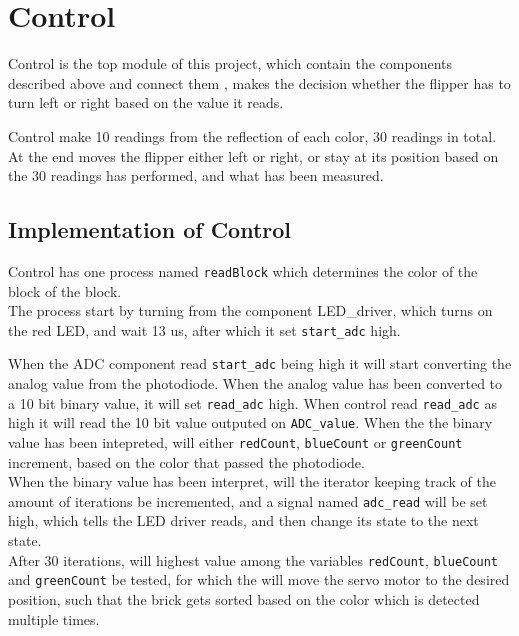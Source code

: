 \section{Control}
Control is the top module of this project, which contain the components described above and connect them , makes the decision whether the flipper has to turn left or right based on the value it reads.

Control make 10 readings from the reflection of each color,  30 readings in total. At the end moves the flipper either left or right, or stay at its position based on the 30 readings has performed, and what has been measured. 

\subsection{Implementation of Control}


Control has  one process named \texttt{readBlock} which determines the color of the block of the block. \\



The process start by turning from the component LED_driver, which turns on the red LED, and wait 13 us, after which it set \texttt{start\_adc} high.

When the ADC component read \texttt{start\_adc} being high it will start converting the analog value from the photodiode.  When the analog value has been converted to a 10 bit binary value, it will set \texttt{read\_adc} high. When control read \texttt{read\_adc} as high it will read the 10 bit value outputed on \texttt{ADC\_value}. When the the binary value has been intepreted, will either \texttt{redCount}, \texttt{blueCount} or \texttt{greenCount} increment, based on the color that passed the photodiode.  \\


When the binary value has been interpret, will the iterator keeping track of the amount of iterations be incremented,  and a signal named \texttt{adc\_read} will be set high, which tells the LED driver reads, and then change its state to the next state.\\


After 30 iterations,  will highest value among the variables \texttt{redCount}, \texttt{blueCount} and \texttt{greenCount} be tested, for which the will move the servo motor to the desired position, such that the brick gets sorted based on the color which is detected multiple times. 


